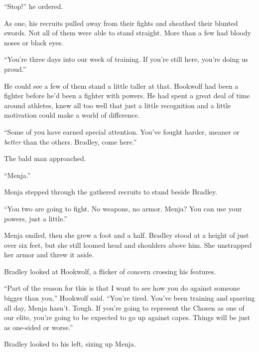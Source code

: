 ``Stop!'' he ordered.



As one, his recruits pulled away from their fights and sheathed their blunted swords.  Not all of them were able to stand straight.  More than a few had bloody noses or black eyes.



``You're three days into our week of training.  If you're still here, you're doing us proud.''



He could see a few of them stand a little taller at that.  Hookwolf had been a fighter before he'd been a fighter with powers.  He had spent a great deal of time around athletes, knew all too well that just a little recognition and a little motivation could make a world of difference.



``Some of you have earned special attention.  You've fought harder, meaner or \emph{better} than the others.  Bradley, come here.''



The bald man approached.



``Menja.''



Menja stepped through the gathered recruits to stand beside Bradley.



``You two are going to fight.  No weapons, no armor.  Menja?  You can use your powers, just a little.''



Menja smiled, then she grew a foot and a half.  Bradley stood at a height of just over six feet, but she still loomed head and shoulders above him.  She unstrapped her armor and threw it aside.



Bradley looked at Hookwolf, a flicker of concern crossing his features.



``Part of the reason for this is that I want to see how you do against someone bigger than you,'' Hookwolf said.  ``You're tired.  You've been training and sparring all day, Menja hasn't.  Tough.  If you're going to represent the Chosen as one of our elite, you're going to be expected to go up against capes.  Things will be just as one-sided or worse.''



Bradley looked to his left, sizing up Menja.



